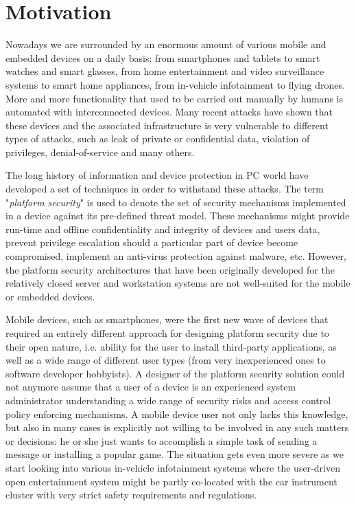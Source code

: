 \begin{quoting}
\end{quoting}

\section{Motivation}

Nowadays we are surrounded by an enormous amount of various mobile and embedded devices on a daily basis: from smartphones and tablets to smart watches and smart glasses, from home entertainment and video surveillance systems to smart home appliances, from in-vehicle infotainment to flying drones. More and more functionality that used to be carried out manually by humans is automated with interconnected devices. Many recent attacks have shown that these devices and the associated infrastructure is very vulnerable to different types of attacks, such as leak of private or confidential data, violation of privileges, denial-of-service and many others. 

The long history of information and device protection in PC world have developed a set of techniques in order to withstand these attacks. The term "\textit{platform security}" is used to denote the set of security mechanisms implemented in a device against its pre-defined threat model. These mechanisms might provide run-time and offline confidentiality and integrity of devices and users data, prevent privilege escalation should a particular part of device become compromised, implement an anti-virus protection against malware, etc. However, the platform security architectures that have been originally developed for the relatively closed server and workstation systems are not well-suited for the mobile or embedded devices. 

Mobile devices, such as smartphones, were the first new wave of devices that required an entirely different approach for designing platform security due to their open nature, i.e. ability for the user to install third-party applications, as well as a wide range of different user types (from very inexperienced ones to software developer hobbyists). A designer of the platform security solution could not anymore assume that a user of a device is an experienced system administrator understanding a wide range of security risks and access control policy enforcing mechanisms. A mobile device user not only lacks this knowledge, but also in many cases is explicitly not willing to be involved in any such matters or decisions: he or she just wants to accomplish a simple task of sending a message or installing a popular game. The situation gets even more severe as we start looking into various in-vehicle infotainment systems where the user-driven open entertainment system might be partly co-located with the car instrument cluster with very strict safety requirements and regulations. 

